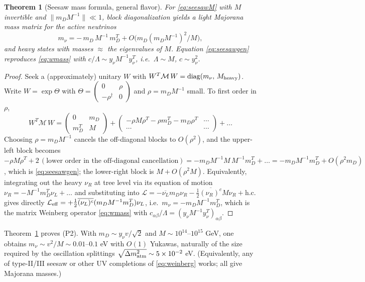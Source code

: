 \documentclass[12pt]{article}
\newtheorem{theorem}{Theorem}
\theoremstyle{definition}
\newcommand{\nuL}{\nu_L}
\newcommand{\nuR}{\nu_R}
\begin{document}
\begin{theorem}[Seesaw mass formula, general flavor]\label{thm:seesaw}
For \eqref{eq:seesawM} with $M$ invertible and
$\|m_D M^{-1}\|\ll1$, block diagonalization yields a light Majorana mass
matrix for the active neutrinos
\begin{equation}\label{eq:seesawgen}
m_\nu=-\,m_D\,M^{-1}\,m_D^{T}+O\!\big(m_D (m_D M^{-1})^2/M\big),
\end{equation}
and heavy states with masses $\approx$ the eigenvalues of $M$. Equation
\eqref{eq:seesawgen} reproduces \eqref{eq:wmass} with
$c/\Lambda \sim y_\nu M^{-1} y_\nu^T$, i.e.\
$\Lambda\sim M$, $c\sim y_\nu^2$.
\end{theorem}
\begin{proof}
Seek a (approximately) unitary $W$ with
$W^T\mathcal M\,W=\operatorname{diag}(m_\nu,\,M_{\rm heavy})$. Write
$W=\exp\Theta$ with
$\Theta=\left(\begin{smallmatrix}0&\rho\\-\rho^\dagger&0\end{smallmatrix}\right)$
and $\rho=m_D M^{-1}$ small. To first order in $\rho$,
\[
W^T\mathcal M\,W
=\begin{pmatrix}0 & m_D\\ m_D^T & M\end{pmatrix}
+\begin{pmatrix}-\rho M\rho^T-\rho m_D^T -m_D\rho^T & \cdots\\
\cdots & \cdots\end{pmatrix}+\dots
\]
Choosing $\rho=m_D M^{-1}$ cancels the off-diagonal blocks to
$O(\rho^2)$, and the upper-left block becomes
$-\rho M\rho^T+2\,(\text{lower order in the off-diagonal cancellation})
=-m_DM^{-1}M\,M^{-1}m_D^T+\dots=-m_DM^{-1}m_D^T+O(\rho^2 m_D)$, which is
\eqref{eq:seesawgen}; the lower-right block is $M+O(\rho^2 M)$. Equivalently,
integrating out the heavy $\nuR$ at tree level via its equation of motion
$\nuR=-M^{-1}m_D^T\nuL+\dots$ and substituting into
$\mathcal L=-\overline{\nuL}m_D\nuR-\tfrac12\overline{(\nuR)^c}M\nuR
+\text{h.c.}$ gives directly
$\mathcal L_{\rm eff}=+\tfrac12\overline{(\nuL)^c}(m_DM^{-1}m_D^T)\nuL$,
i.e.\ $m_\nu=-m_DM^{-1}m_D^T$, which is the matrix Weinberg operator
\eqref{eq:wmass} with $c_{\alpha\beta}/\Lambda
=(y_\nu M^{-1}y_\nu^T)_{\alpha\beta}$.
\end{proof}

Theorem~\ref{thm:seesaw} proves (P2). With
$m_D\sim y_\nu v/\sqrt2$ and $M\sim10^{14}$--$10^{15}$ GeV, one obtains
$m_\nu\sim v^2/M\sim0.01$--$0.1$ eV with $O(1)$ Yukawas, naturally of the
size required by the oscillation splittings $\sqrt{\Delta m^2_{\rm atm}}
\sim5\times10^{-2}$ eV. (Equivalently, any of type-II/III seesaw or other
UV completions of \eqref{eq:weinberg} works; all give Majorana masses.)
\end{document}
